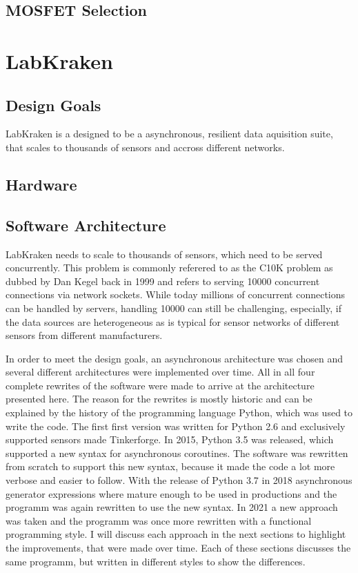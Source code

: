 \subsection{MOSFET Selection}

\clearpage
\section{LabKraken}
\subsection{Design Goals}
LabKraken is a designed to be a asynchronous, resilient data aquisition suite, that scales to thousands of sensors and accross different networks.
\subsection{Hardware}
\subsection{Software Architecture}
LabKraken needs to scale to thousands of sensors, which need to be served concurrently. This problem is commonly referered to as the C10K problem as dubbed by Dan Kegel back in 1999 \cite{10kProblem} and refers to serving \num{10000} concurrent connections via network sockets. While today millions of concurrent connections can be handled by servers, handling \num{10000} can still be challenging, especially, if the data sources are heterogeneous as is typical for sensor networks of different sensors from different manufacturers.

In order to meet the design goals, an asynchronous architecture was chosen and several different architectures were implemented over time. All in all four complete rewrites of the software were made to arrive at the architecture presented here. The reason for the rewrites is mostly historic and can be explained by the history of the programming language Python, which was used to write the code. The first first version was written for Python 2.6 and exclusively supported sensors made Tinkerforge. In 2015, Python 3.5 was released, which supported a new syntax for asynchronous coroutines. The software was rewritten from scratch to support this new syntax, because it made the code a lot more verbose and easier to follow. With the release of Python 3.7 in 2018 asynchronous generator expressions where mature enough to be used in productions and the programm was again rewritten to use the new syntax. In 2021 a new approach was taken and the programm was once more rewritten with a functional programming style. I will discuss each approach in the next sections to highlight the improvements, that were made over time. Each of these sections discusses the same programm, but written in different styles to show the differences.

